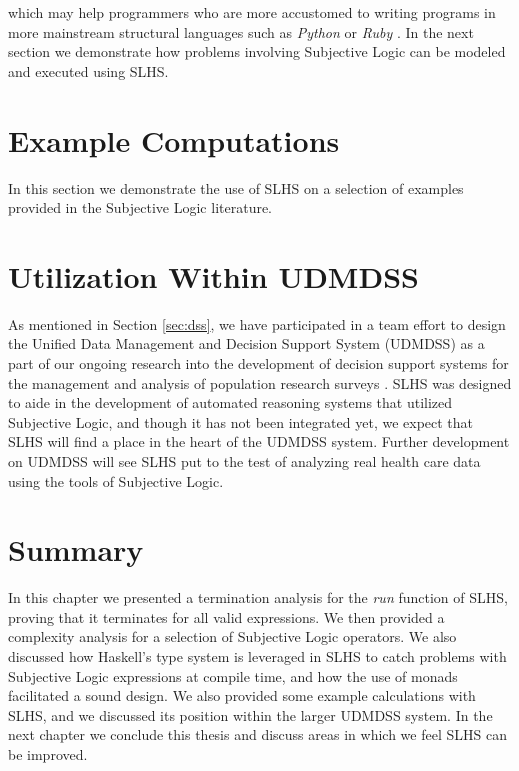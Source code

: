 \documentclass[thesis.tex]{subfiles}
\begin{document}
which may help programmers who are more accustomed to writing programs in more mainstream
structural languages such as \emph{Python} \cite{van2003python} or \emph{Ruby} \cite{matsumoto2002ruby}.
In the next section we demonstrate how
problems involving Subjective Logic can be modeled and executed using SLHS.




\section{Example Computations}
\label{sec:examples}

In this section we demonstrate the use of SLHS on a selection of examples provided in the
Subjective Logic literature.






\section{Utilization Within UDMDSS}

As mentioned in Section \ref{sec:dss}, we have participated in a team effort to design the
Unified Data Management and Decision Support System (UDMDSS)
as a part of our ongoing research into the development of decision support systems for
the management and analysis of population research surveys \cite{kent2010towards, kent2011design, kobti2011towards}.
SLHS was designed to aide in the
development of automated reasoning systems that utilized Subjective Logic, and though it has
not been integrated yet, we expect that SLHS will find a place in the heart of the UDMDSS
system. Further development on UDMDSS will see SLHS put to the test of analyzing real health care
data using the tools of Subjective Logic.




\section{Summary}

In this chapter we presented a termination analysis for the \emph{run} function of SLHS, proving
that it terminates for all valid expressions. We then provided a complexity analysis for a selection
of Subjective Logic operators. We also discussed how Haskell's type system is leveraged in SLHS
to catch problems with Subjective Logic expressions at compile time, and how the use of monads facilitated a sound design.
We also provided some example calculations with SLHS, and we discussed its position within the larger UDMDSS system.
In the next chapter we conclude this thesis and discuss areas in which we feel SLHS can be improved.
\end{document}
